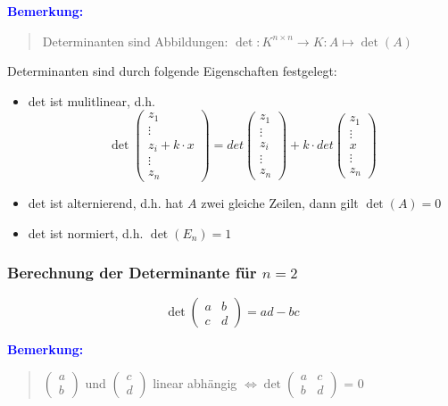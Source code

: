 \documentclass{article}
\newcommand{\blue}[1]{\textcolor{blue}{#1}}
\newcommand{\an}[1]{\blue{\textbf{Bemerkung: }}\begin{quote}#1\end{quote}}
\newcommand{\vvec}[2]{\begin{pmatrix}#1\\#2\end{pmatrix}}
\begin{document}
\an{
    Determinanten sind Abbildungen: $\det: K^{n \times n} \to K: A \mapsto \det(A)$
}

Determinanten sind durch folgende Eigenschaften festgelegt:
\begin{itemize}
    \item det ist mulitlinear, d.h.
    $$
    \det 
    \begin{pmatrix}
        z_1 \\
        \vdots \\
        z_i + k \cdot x \\
        \vdots \\
        z_n
    \end{pmatrix} = det
    \begin{pmatrix}
        z_1 \\
        \vdots \\
        z_i \\
        \vdots \\
        z_n
    \end{pmatrix} + k \cdot det
    \begin{pmatrix}
        z_1 \\
        \vdots \\
        x \\
        \vdots \\
        z_n
    \end{pmatrix}
    $$
    \item det ist alternierend, d.h. hat $A$ zwei gleiche Zeilen, dann gilt $\det(A) = 0$
    \item det ist normiert, d.h. $\det(E_n) = 1$
\end{itemize}

\subsubsection{\texorpdfstring{Berechnung der Determinante für $n = 2$}{Berechnung der Determinante für n = 2}}

\[
    \det \begin{pmatrix}
        a & b\\
        c & d
    \end{pmatrix} = ad - bc
\]

\an{
    $\vvec{a}{b}$ und $\vvec{c}{d}$ linear abhängig $\iff \det \begin{pmatrix}
        a & c\\
        b & d
    \end{pmatrix}$ = 0
}
\end{document}
